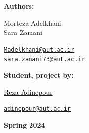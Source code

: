 \documentclass[12pt]{article}
\begin{document}
\begin{flushleft}
    \textbf{\selectfont Authors:}
\end{flushleft}

\begin{center}
    \begin{minipage}{0.5\textwidth}
        \begin{flushleft}
            Morteza Adelkhani\\
            Sara Zamani
        \end{flushleft}
    \end{minipage}%
    \begin{minipage}{0.5\textwidth}
        \begin{flushright}
            \href{mailto:Madelkhani@aut.ac.ir}{\texttt{Madelkhani@aut.ac.ir}}\\
            
            \href{sara.zamani73@aut.ac.ir}{\texttt{sara.zamani73@aut.ac.ir}}
        \end{flushright}
    \end{minipage}
\end{center}

\vspace{0.5em}

\begin{flushleft}
	\textbf{\selectfont Student, project by:} 
\end{flushleft}

\begin{center}
	\begin{minipage}{0.5\textwidth}
		\begin{flushleft}
			\href{https://rezaadinepour.github.io/}{\textcolor{black}{Reza Adinepour}}
		\end{flushleft}
	\end{minipage}%
	\begin{minipage}{0.5\textwidth}
		\begin{flushright}
			\href{mailto:adinepour@aut.ac.ir}{\texttt{adinepour@aut.ac.ir}}\\
		\end{flushright}
	\end{minipage}
\end{center}



    
\begin{center}
    \bigskip \bigskip \bigskip \bigskip
    \large \bf {}\selectfont Spring 2024
\end{center}
\end{document}
